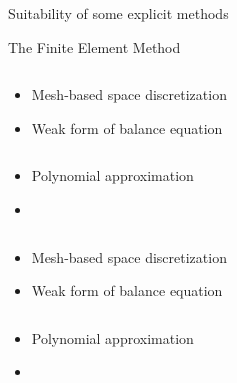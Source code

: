 \begin{withoutheadline}
  \begin{frame}{Suitability of some explicit methods}
    \begin{block}{The Finite Element Method \cite{Belytschko}}
      \vskip 4pt
      \begin{overprint}
        \begin{columns}
          \begin{footnotesize}
            \begin{column}{0.5\textwidth}
              \begin{itemize}
              \item[] Mesh-based space discretization
              \item[] Weak form of balance equation
              \end{itemize}
            \end{column}
            \begin{column}{0.5\textwidth} 
              \begin{itemize}
              \item[] Polynomial approximation
              \item[] %
              \end{itemize}
            \end{column}
          \end{footnotesize}
        \end{columns}
        \begin{columns}
          \begin{footnotesize}
            \begin{column}{0.5\textwidth}
              \begin{itemize}
              \item[] Mesh-based space discretization
              \item[] Weak form of balance equation
              \end{itemize}
            \end{column}
            \begin{column}{0.5\textwidth} 
              \begin{itemize}
              \item[] Polynomial approximation
              \item[] %
              \end{itemize}
            \end{column}

\end{footnotesize}
\end{columns}
\end{overprint}
\end{block}
\end{frame}
\end{withoutheadline}
